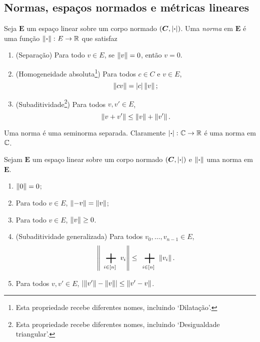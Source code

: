 \subsection{Normas, espaços normados e métricas lineares}

\begin{definition}
Seja $\bm E$ um espaço linear sobre um corpo normado $(\bm C,\left\vert{\bm{\cdot}}\right\vert)$. Uma \emph{norma} em $\bm E$ é uma função $\left\Vert{\bm{\cdot}}\right\Vert\colon E \to \mathbb{R}$
que satisfaz
	\begin{enumerate}
	\item (Separação) Para todo $v \in E$, se $\left\Vert{v}\right\Vert=0$, então $v=0$.
	\item (Homogeneidade absoluta\footnote{Esta propriedade recebe diferentes nomes, incluindo `Dilatação'.}) Para todos $c \in C$ e $v \in E$,
		\begin{equation*}
		\left\Vert{cv}\right\Vert = \left\vert{c}\right\vert\left\Vert{v}\right\Vert;
		\end{equation*}
	\item (Subaditividade\footnote{Esta propriedade recebe diferentes nomes, incluindo `Desigualdade triangular'.}) Para todos $v,v' \in E$,
		\begin{equation*}
		\left\Vert{v + v'}\right\Vert \leq \left\Vert{v}\right\Vert + \left\Vert{v'}\right\Vert.
		\end{equation*}
	\end{enumerate}
\end{definition}

Uma norma é uma seminorma separada. Claramente $\left\vert{\bm{\cdot}}\right\vert\colon \mathbb{C} \to \mathbb{R}$ é uma norma em $\mathbb{C}$.

\begin{proposition}
Sejam $\bm E$ um espaço linear sobre um corpo normado $(\bm C,\left\vert{\bm{\cdot}}\right\vert)$ e $\left\Vert{\bm{\cdot}}\right\Vert$ uma norma em $\bm E$.
	\begin{enumerate}
	\item $\left\Vert{0}\right\Vert=0$;
	\item Para todo $v \in E$, $\left\Vert{-v}\right\Vert=\left\Vert{v}\right\Vert$;
	\item Para todo $v \in E$, $\left\Vert{v}\right\Vert \geq 0$.
	\item (Subaditividade generalizada) Para todos $v_0,\dots,v_{n-1} \in E$,
		\begin{equation*}
		\nor{\sum_{i \in [n]} v_i} \leq \sum_{i \in [n]} \nor{v_i}.
		\end{equation*}
	\item Para todos $v,v' \in E$, $\left\vert{\left\Vert{v'}\right\Vert-\left\Vert{v}\right\Vert}\right\vert \leq \left\Vert{v'-v}\right\Vert$.
	\end{enumerate}
\end{proposition}


